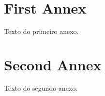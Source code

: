 \begin{anexosenv}

\partanexos

\chapter{First Annex}

Texto do primeiro anexo.

\chapter{Second  Annex}

Texto do segundo anexo.

\end{anexosenv}


